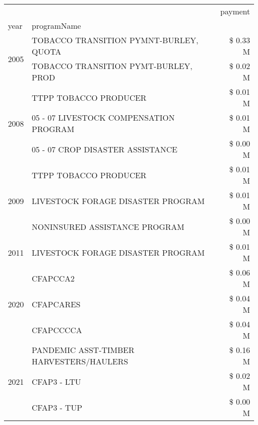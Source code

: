 \begin{tabular}{llr}
\toprule
 &  & payment \\
year & programName &  \\
\midrule
\multirow[t]{2}{*}{2005} & TOBACCO TRANSITION PYMNT-BURLEY, QUOTA & \$ 0.33 M \\
 & TOBACCO TRANSITION PYMT-BURLEY, PROD & \$ 0.02 M \\
\cline{1-3}
\multirow[t]{3}{*}{2008} & TTPP TOBACCO PRODUCER & \$ 0.01 M \\
 & 05 - 07 LIVESTOCK COMPENSATION PROGRAM & \$ 0.01 M \\
 & 05 - 07 CROP DISASTER ASSISTANCE & \$ 0.00 M \\
\cline{1-3}
\multirow[t]{3}{*}{2009} & TTPP TOBACCO PRODUCER & \$ 0.01 M \\
 & LIVESTOCK FORAGE DISASTER  PROGRAM & \$ 0.01 M \\
 & NONINSURED ASSISTANCE PROGRAM & \$ 0.00 M \\
\cline{1-3}
2011 & LIVESTOCK FORAGE DISASTER PROGRAM & \$ 0.01 M \\
\cline{1-3}
\multirow[t]{3}{*}{2020} & CFAPCCA2 & \$ 0.06 M \\
 & CFAPCARES & \$ 0.04 M \\
 & CFAPCCCCA & \$ 0.04 M \\
\cline{1-3}
\multirow[t]{3}{*}{2021} & PANDEMIC ASST-TIMBER HARVESTERS/HAULERS & \$ 0.16 M \\
 & CFAP3 - LTU & \$ 0.02 M \\
 & CFAP3 - TUP & \$ 0.00 M \\
\cline{1-3}
\bottomrule
\end{tabular}
